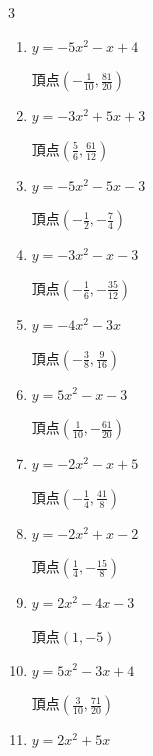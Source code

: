 \begin{multicols}{3}
\begin{enumerate}
        $\displaystyle 頂点\left( -\frac{1}{6} , \frac{23}{12} \right)$

  \item $\displaystyle y=-5x^{2}-x+4$

        $\displaystyle 頂点\left( -\frac{1}{10} , \frac{81}{20} \right)$

\columnbreak %

  \item $\displaystyle y=-3x^{2}+5x+3$

        $\displaystyle 頂点\left( \frac{5}{6} , \frac{61}{12} \right)$

  \item $\displaystyle y=-5x^{2}-5x-3$

        $\displaystyle 頂点\left( -\frac{1}{2} , -\frac{7}{4} \right)$

  \item $\displaystyle y=-3x^{2}-x-3$

        $\displaystyle 頂点\left( -\frac{1}{6} , -\frac{35}{12} \right)$

  \item $\displaystyle y=-4x^{2}-3x$

        $\displaystyle 頂点\left( -\frac{3}{8} , \frac{9}{16} \right)$

  \item $\displaystyle y=5x^{2}-x-3$

        $\displaystyle 頂点\left( \frac{1}{10} , -\frac{61}{20} \right)$

\columnbreak %

\resetques

  \item $\displaystyle y=-2x^{2}-x+5$

        $\displaystyle 頂点\left( -\frac{1}{4} , \frac{41}{8} \right)$

  \item $\displaystyle y=-2x^{2}+x-2$

        $\displaystyle 頂点\left( \frac{1}{4} , -\frac{15}{8} \right)$

  \item $\displaystyle y=2x^{2}-4x-3$

        $\displaystyle 頂点\left( 1 , -5 \right)$

  \item $\displaystyle y=5x^{2}-3x+4$

        $\displaystyle 頂点\left( \frac{3}{10} , \frac{71}{20} \right)$

  \item $\displaystyle y=2x^{2}+5x$


\end{enumerate}
\end{multicols}

